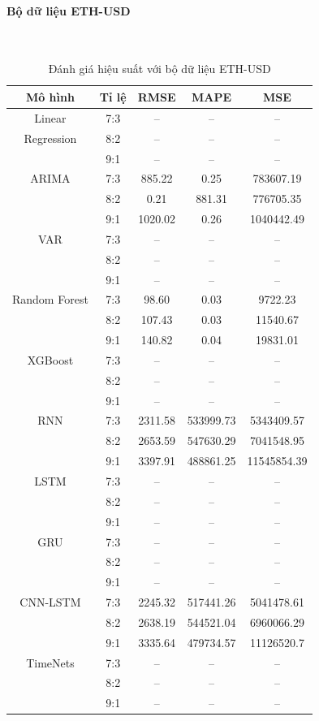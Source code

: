 \documentclass[conference]{IEEEtran}
\begin{document}
\paragraph{\textbf{Bộ dữ liệu ETH-USD}} \mbox{} \\
\begin{table}[H]
	\centering
	\caption{Đánh giá hiệu suất với bộ dữ liệu ETH-USD}
	\begin{tabular}{|c|c|c|c|c|}
		\hline
		Mô hình & Tỉ lệ & RMSE & MAPE & MSE \\ \hline
		Linear & 7:3 & -- & -- & -- \\
		Regression & 8:2 & -- & -- & -- \\
		& 9:1 & -- & -- & -- \\ \hline
		ARIMA & 7:3 & 885.22 & 0.25 & 783607.19 \\
		& 8:2 & 0.21 & 881.31 & 776705.35 \\
		& 9:1 & 1020.02 & 0.26 & 1040442.49 \\ \hline
		VAR & 7:3 & -- & -- & -- \\
		& 8:2 & -- & -- & -- \\
		& 9:1 & -- & -- & -- \\ \hline
		Random Forest & 7:3 & 98.60 & 0.03 & 9722.23 \\
		& 8:2 & 107.43 & 0.03 & 11540.67 \\
		& 9:1 & 140.82 & 0.04 & 19831.01 \\ \hline
		XGBoost & 7:3 & -- & -- & -- \\
		& 8:2 & -- & -- & -- \\
		& 9:1 & -- & -- & -- \\ \hline
		RNN & 7:3 & 2311.58 & 533999.73 & 5343409.57 \\
		& 8:2 & 2653.59 & 547630.29 & 7041548.95 \\
		& 9:1 & 3397.91 & 488861.25 & 11545854.39 \\ \hline
		LSTM & 7:3 & -- & -- & -- \\
		& 8:2 & -- & -- & -- \\
		& 9:1 & -- & -- & -- \\ \hline
		GRU & 7:3 & -- & -- & -- \\
		& 8:2 & -- & -- & -- \\
		& 9:1 & -- & -- & -- \\ \hline
		CNN-LSTM & 7:3 & 2245.32 & 517441.26 & 5041478.61 \\
		& 8:2 & 2638.19 & 544521.04 & 6960066.29 \\
		& 9:1 & 3335.64 & 479734.57 & 11126520.7 \\ \hline
		TimeNets & 7:3 & -- & -- & -- \\
		& 8:2 & -- & -- & -- \\
		& 9:1 & -- & -- & -- \\ \hline
	\end{tabular}
\end{table}
\end{document}
